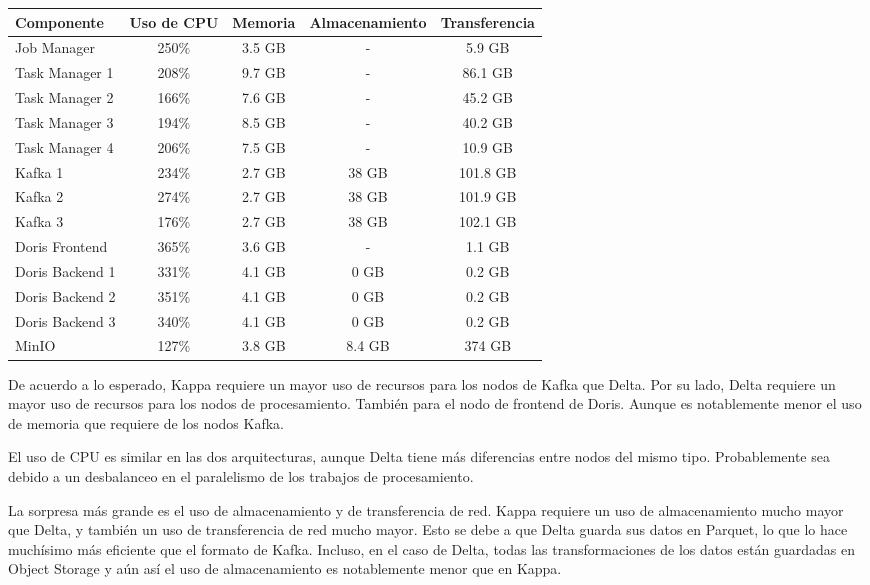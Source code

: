 \begin{longtable}{|p{3cm}|c|c|c|c|}
    \hline
    \textbf{Componente} & \textbf{Uso de CPU} & \textbf{Memoria} & \textbf{Almacenamiento} & \textbf{Transferencia} \\
    \hline
    Job Manager & 250\% & 3.5 GB & - & 5.9 GB \\
    \hline
    Task Manager 1 & 208\% & 9.7 GB & - & 86.1 GB \\
    \hline
    Task Manager 2 & 166\% & 7.6 GB & - & 45.2 GB \\
    \hline
    Task Manager 3 & 194\% & 8.5 GB & - & 40.2 GB \\
    \hline
    Task Manager 4 & 206\% & 7.5 GB & - & 10.9 GB \\
    \hline
    Kafka 1 & 234\% & 2.7 GB & 38 GB & 101.8 GB \\
    \hline
    Kafka 2 & 274\% & 2.7 GB & 38 GB & 101.9 GB \\
    \hline
    Kafka 3 & 176\% & 2.7 GB & 38 GB & 102.1 GB \\
    \hline
    Doris Frontend & 365\% & 3.6 GB & - & 1.1 GB \\
    \hline
    Doris Backend 1 & 331\% & 4.1 GB & 0 GB & 0.2 GB \\
    \hline
    Doris Backend 2 & 351\% & 4.1 GB & 0 GB & 0.2 GB \\
    \hline
    Doris Backend 3 & 340\% & 4.1 GB & 0 GB & 0.2 GB \\
    \hline 
    MinIO & 127\% & 3.8 GB & 8.4 GB & 374 GB \\
    \hline
\end{longtable}

\newpage

De acuerdo a lo esperado, Kappa requiere un mayor uso de recursos para los nodos de Kafka que Delta.
Por su lado, Delta requiere un mayor uso de recursos para los nodos de procesamiento. También para el nodo de frontend de Doris. 
Aunque es notablemente menor el uso de memoria que requiere de los nodos Kafka. \newline

El uso de CPU es similar en las dos arquitecturas, aunque Delta tiene más diferencias entre nodos del mismo tipo. 
Probablemente sea debido a un desbalanceo en el paralelismo de los trabajos de procesamiento. \newline 

La sorpresa más grande es el uso de almacenamiento y de transferencia de red. 
Kappa requiere un uso de almacenamiento mucho mayor que Delta, y también un uso de transferencia de red mucho mayor.
Esto se debe a que Delta guarda sus datos en Parquet, lo que lo hace muchísimo más eficiente que el formato de Kafka.
Incluso, en el caso de Delta, todas las transformaciones de los datos están guardadas en Object Storage 
y aún así el uso de almacenamiento es notablemente menor que en Kappa. 

